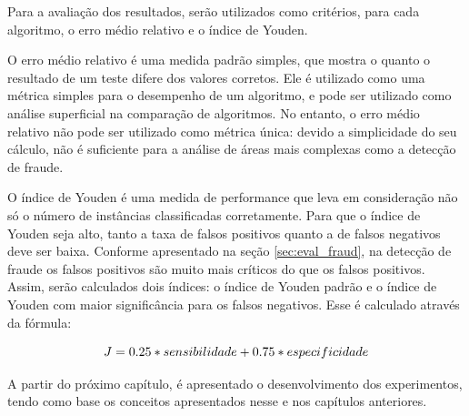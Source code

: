 Para a avaliação dos resultados, serão utilizados como critérios, para cada algoritmo, o erro médio relativo e o índice de Youden.

O erro médio relativo é uma medida padrão simples, que mostra o quanto o resultado de um teste difere dos valores corretos. Ele é utilizado como uma métrica simples para o desempenho de um algoritmo, e pode ser utilizado como análise superficial na comparação de algoritmos. No entanto, o erro médio relativo não pode ser utilizado como métrica única: devido a simplicidade do seu cálculo, não é suficiente para a análise de áreas mais complexas como a detecção de fraude.

O índice de Youden é uma medida de performance que leva em consideração não só o número de instâncias classificadas corretamente. Para que o índice de Youden seja alto, tanto a taxa de falsos positivos quanto a de falsos negativos deve ser baixa. Conforme apresentado na seção \ref{sec:eval_fraud}, na detecção de fraude os falsos positivos são muito mais críticos do que os falsos positivos. Assim, serão calculados dois índices: o índice de Youden padrão e o índice de Youden com maior significância para os falsos negativos. Esse é calculado através da fórmula:

\begin{equation}
    \vspace{2mm}
    J = 0.25 * sensibilidade + 0.75 * especificidade
    \vspace{2mm}
\end{equation}

A partir do próximo capítulo, é apresentado o desenvolvimento dos experimentos, tendo como base os conceitos apresentados nesse e nos capítulos anteriores.
